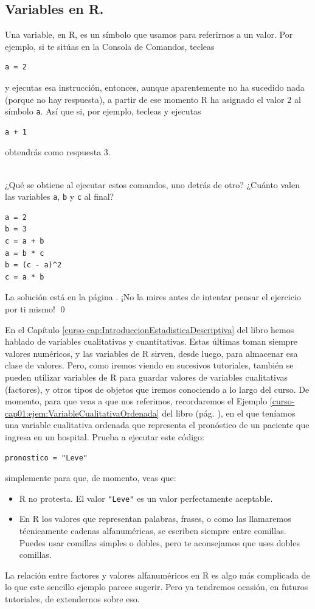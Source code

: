 \documentclass[10pt,a4paper]{article}\usepackage[]{graphicx}\usepackage[]{color}
\begin{document}
\subsection{Variables en R.}

Una {\sf variable}, en R, es un símbolo que usamos para referirnos a un valor. Por ejemplo, si te sitúas en la Consola de Comandos, tecleas
\begin{verbatim}
a = 2
\end{verbatim}
y ejecutas esa instrucción, entonces, aunque aparentemente no ha sucedido nada (porque no hay respuesta), a partir de ese momento R ha asignado el valor 2 al símbolo {\tt a}. Así que si, por ejemplo, tecleas y ejecutas
\begin{verbatim}
a + 1
\end{verbatim}
obtendrás como respuesta $3$.
\begin{ejercicio}
\label{tut02:ejercicio02}
\quad\\
¿Qué se obtiene al ejecutar estos comandos, uno detrás de otro? ¿Cuánto valen las variables {\tt a}, {\tt b} y {\tt c} al final?
\begin{verbatim}
a = 2
b = 3
c = a + b
a = b * c
b = (c - a)^2
c = a * b
\end{verbatim}
La solución está en la página \pageref{tut02:ejercicio02:sol}. ¡No la mires antes de intentar pensar el ejercicio por ti mismo!
\qed
\end{ejercicio}

En el Capítulo \ref{curso-cap:IntroduccionEstadisticaDescriptiva} del libro hemos hablado de variables cualitativas y cuantitativas. Estas últimas toman siempre valores numéricos, y las variables de R sirven, desde luego, para almacenar esa clase de valores. Pero, como iremos viendo en sucesivos tutoriales,  también se pueden utilizar variables de R para guardar valores de variables cualitativas (factores), y  otros tipos de objetos que iremos conociendo a lo largo del curso. De momento, para que veas a que nos referimos, recordaremos el Ejemplo \ref{curso-cap01:ejem:VariableCualitativaOrdenada} del libro (pág. \pageref{curso-cap01:ejem:VariableCualitativaOrdenada}), en el que teníamos una variable cualitativa ordenada que representa el pronóstico de un paciente que ingresa en un hospital. Prueba a ejecutar este código:

\begin{verbatim}
pronostico = "Leve"
\end{verbatim}
simplemente para que, de momento, veas que:
\begin{itemize}
  \item R no protesta. El valor \verb#"Leve"# es un valor perfectamente aceptable.
  \item En R los valores que representan palabras, frases, o como las llamaremos técnicamente {\sf cadenas alfanuméricas}, se escriben siempre entre comillas. Puedes usar comillas simples o dobles, pero te aconsejamos que uses dobles comillas.
\end{itemize}
La relación entre factores y valores alfanuméricos en R es algo más complicada de lo que este sencillo ejemplo parece sugerir. Pero ya tendremos ocasión, en futuros tutoriales, de extendernos sobre eso.
\end{document}
